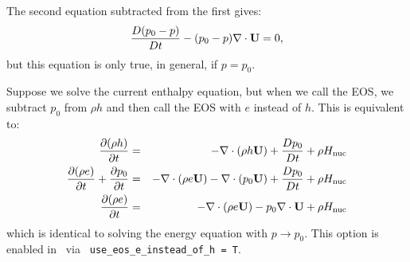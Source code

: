 The second equation subtracted from the first gives:
\begin{equation} \label{eq:difference between h and e equations}
  \frac{D (p_0 - p)}{Dt} - (p_0 - p)  \nabla \cdot {\bf U} = 0,
\end{equation}
but this equation is only true, in general, if $p=p_0$.

Suppose we solve the current enthalpy equation, but when we call the
EOS, we subtract $p_0$ from $\rho h$ and then call the EOS with $e$
instead of $h$.  This is equivalent to:
\begin{eqnarray}
\frac{\partial(\rho h)}{\partial t} &=& -\nabla\cdot(\rho h\Ub) +
  \frac{Dp_0}{Dt} + \rho\Hnuc \nonumber \\
%
\frac{\partial(\rho e)}{\partial t} + \frac{\partial p_0}{\partial t} &=&
 -\nabla\cdot(\rho e\Ub) -\nabla\cdot(p_0 \Ub) + \frac{Dp_0}{Dt} + \rho\Hnuc \nonumber \\
%
\frac{\partial(\rho e)}{\partial t} &=&
 -\nabla\cdot(\rho e\Ub) - p_0 \nabla\cdot\Ub + \rho\Hnuc  \nonumber
\end{eqnarray}
which is identical to solving the energy equation with $p\to p_0$.
This option is enabled in \maestro\ via {\tt
  use\_eos\_e\_instead\_of\_h = T}.



